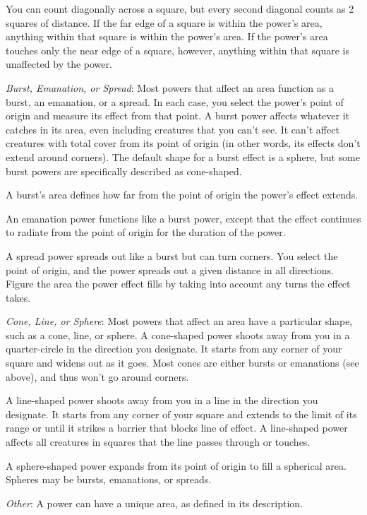 You can count diagonally across a square, but every second diagonal counts as 2 squares of distance. If the far edge of a square is within the power's area, anything within that square is within the power's area. If the power's area touches only the near edge of a square, however, anything within that square is unaffected by the power.

\textit{Burst, Emanation, or Spread}: Most powers that affect an area function as a burst, an emanation, or a spread. In each case, you select the power's point of origin and measure its effect from that point. A burst power affects whatever it catches in its area, even including creatures that you can't see. It can't affect creatures with total cover from its point of origin (in other words, its effects don't extend around corners). The default shape for a burst effect is a sphere, but some burst powers are specifically described as cone-shaped.

A burst's area defines how far from the point of origin the power's effect extends.

An emanation power functions like a burst power, except that the effect continues to radiate from the point of origin for the duration of the power.

A spread power spreads out like a burst but can turn corners. You select the point of origin, and the power spreads out a given distance in all directions. Figure the area the power effect fills by taking into account any turns the effect takes.

\textit{Cone, Line, or Sphere}: Most powers that affect an area have a particular shape, such as a cone, line, or sphere. A cone-shaped power shoots away from you in a quarter-circle in the direction you designate. It starts from any corner of your square and widens out as it goes. Most cones are either bursts or emanations (see above), and thus won't go around corners.

A line-shaped power shoots away from you in a line in the direction you designate. It starts from any corner of your square and extends to the limit of its range or until it strikes a barrier that blocks line of effect. A line-shaped power affects all creatures in squares that the line passes through or touches.

A sphere-shaped power expands from its point of origin to fill a spherical area. Spheres may be bursts, emanations, or spreads.

\textit{Other}: A power can have a unique area, as defined in its description.

